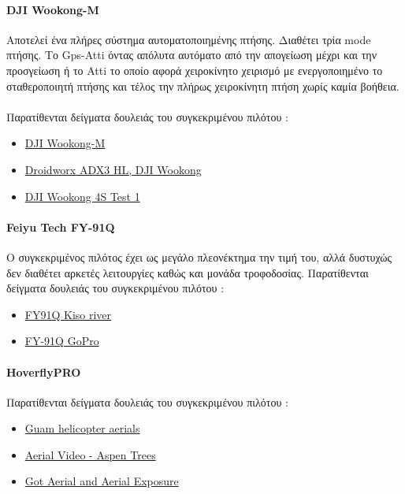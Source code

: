 \documentclass[a4paper, 12pt, twoside]{report}
\begin{document}
{{{{{{			\paragraph{DJI Wookong-M}{Αποτελεί ένα πλήρες σύστημα αυτοματοποιημένης πτήσης. Διαθέτει τρία mode πτήσης. Το Gps-Atti όντας απόλυτα αυτόματο από την απογείωση μέχρι και την προσγείωση ή το Atti το οποίο αφορά χειροκίνητο χειρισμό με ενεργοποιημένο το σταθεροποιητή πτήσης και τέλος την πλήρως χειροκίνητη πτήση χωρίς καμία βοήθεια.
			}
			\paragraph{}{Παρατίθενται δείγματα δουλειάς του συγκεκριμένου πιλότου :
				\begin{itemize}
					\item \href{https://vimeo.com/38972821}{DJI Wookong-M}
					\item \href{https://vimeo.com/43035644}{Droidworx ADX3 HL, DJI Wookong}
					\item \href{https://vimeo.com/40803086}{DJI Wookong 4S Test 1}			
				\end{itemize}
			}
			
			\paragraph{Feiyu Tech FY-91Q}{Ο συγκεκριμένος πιλότος έχει ως μεγάλο πλεονέκτημα την τιμή του, αλλά δυστυχώς δεν διαθέτει αρκετές λειτουργίες καθώς και μονάδα τροφοδοσίας. Παρατίθενται δείγματα δουλειάς του συγκεκριμένου πιλότου :
				\begin{itemize}
					\item \href{https://vimeo.com/27469866}{FY91Q Kiso river}
					\item \href{http://www.youtube.com/watch?v=5JWZVufFHKQ}{FY-91Q GoPro}
				\end{itemize}
			}
			
			\paragraph{HoverflyPRO}{Παρατίθενται δείγματα δουλειάς του συγκεκριμένου πιλότου :
				\begin{itemize}
					\item \href{https://vimeo.com/26895602#}{Guam helicopter aerials}
					\item \href{http://www.youtube.com/watch?v=b0fwnqsdI8w}{Aerial Video - Aspen Trees}
					\item \href{https://vimeo.com/29466533#}{Got Aerial and Aerial Exposure}
				\end{itemize}
			}
			
}}}}}}
\end{document}
